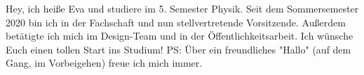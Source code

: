 \begin{multicols}{2}
{
Hey, ich heiße Eva und studiere im 5. Semester Physik. Seit dem Sommersemester 2020 bin ich in der Fachschaft und nun stellvertretende Vorsitzende. Außerdem betätigte ich mich im Design-Team und in der Öffentlichkeitsarbeit. 
Ich wünsche Euch einen tollen Start ins Studium! PS: Über ein freundliches "Hallo" (auf dem Gang, im Vorbeigehen) freue ich mich immer.
} 

\vspace{-0.2cm}


\end{multicols}
